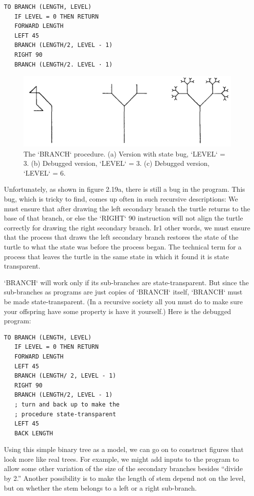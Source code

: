 \documentclass{book}
\begin{document}
\begin{verbatim}
TO BRANCH (LENGTH, LEVEL)
   IF LEVEL = 0 THEN RETURN
   FORWARD LENGTH
   LEFT 45
   BRANCH (LENGTH/2, LEVEL - 1)
   RIGHT 90
   BRANCH (LENGTH/2. LEVEL · 1)
\end{verbatim}
\begin{figure}
\begin{center}
\includegraphics[scale=1]{fig2-19}
\caption{The \textsc{`BRANCH`} procedure. (a) Version with state bug, \textsc{`LEVEL`} = 3. (b) Debugged version, \textsc{`LEVEL`} = 3. (c) Debugged version, \textsc{`LEVEL`} = 6.}
\end{center}
\end{figure}

Unfortunately, as shown in figure 2.19a, there is still a bug in the program. This bug, which is tricky to find, comes up often in such recursive descriptions: We must ensure that after drawing the left secondary
branch the turtle returns to the base of that branch, or else the \textsc{`RIGHT`} 90
instruction will not align the turtle correctly for drawing the right secondary branch. Ir1 other words, we must ensure that the process that draws
the left secondary branch restores the state of the turtle to what the
state was before the process began. The technical term for a process
that leaves the turtle in the same state in which it found it is state transparent.

\textsc{`BRANCH`} will work only if its sub-branches are state-transparent. But
since the sub-branches as programs are just copies of \textsc{`BRANCH`} itself,
\textsc{`BRANCH`} must be made state-transparent. (In a recursive society all you
must do to make sure your offspring have some property is have it
yourself.) Here is the debugged program:

\begin{verbatim}
TO BRANCH (LENGTH, LEVEL)
   IF LEVEL = 0 THEN RETURN
   FORWARD LENGTH
   LEFT 45
   BRANCH (LENGTH/ 2, LEVEL - 1)
   RIGHT 90
   BRANCH (LENGTH/2, LEVEL - 1)
   ; turn and back up to make the
   ; procedure state-transparent
   LEFT 45
   BACK LENGTH
\end{verbatim}
Using this simple binary tree as a model, we can go on to construct
figures that look more like real trees. For example, we might add inputs
to the program to allow some other variation of the size of the secondary
branches besides ``divide by 2.'' Another possibility is to make the length
of stem depend not on the level, but on whether the stem belongs to a
left or a right sub-branch.
\end{document}
